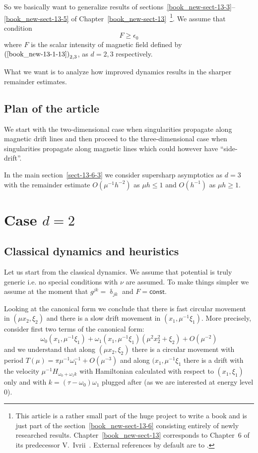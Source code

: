 \documentclass[12pt,oneside,openany,article]{memoir}
\numberwithin{equation}{chapter}
\theoremstyle{plain}
\theoremstyle{definition}
\theoremstyle{remark}
\numberwithin{equation}{chapter}
\newcounter{note}
\begin{document}
So we basically want  to generalize results of sections~\ref{book_new-sect-13-3}--\ref{book_new-sect-13-5} of
Chapter~\ref{book_new-sect-13}~\cite{futurebook}\footnote{\label{foot-13-0} This article is a rather small part of the huge project to write a book and is just part of the section~\ref{book_new-sect-13-6} consisting entirely of newly researched results. Chapter~\ref{book_new-sect-13} corresponds to Chapter~6 of its predecessor V.~Ivrii~\cite{Ivr1}. External references by default are to  \cite{futurebook}.}. We assume that condition \begin{equation}
F\ge \epsilon _0
\label{13-2-1}
\end{equation}
where $F$ is the scalar intensity of magnetic field defined by $\textup{(\ref{book_new-13-1-13})}_{2,3}$,  as $d=2,3$ respectively.

What we want is to analyze how improved dynamics results in the sharper remainder estimates.

\section*{Plan of the article}

We start with the two-dimensional case when singularities propagate along magnetic drift lines and then proceed to the three-dimensional case when singularities propagate along magnetic lines which could however have ``side-drift''.

In the main section~\ref{sect-13-6-3} we consider supersharp asymptotics as $d=3$ with the remainder estimate $O(\mu^{-1}h^{-2})$ as $\mu h\le 1$ and $O(h^{-1})$ as $\mu h\ge 1$.

\chapter{Case $d=2$}
\label{sect-13-6-1}

\section{Classical dynamics and heuristics}
\label{sect-13-6-1-1}

Let us start from the classical dynamics. We assume that potential is truly generic i.e. no special conditions with $\nu$ are assumed. To make things simpler we assume at the moment that $g^{jk}=\updelta_{jk}$ and $F={{\mathsf{const}}}$.

Looking at the canonical form we conclude that there is fast circular movement in $(\mu x_2,\xi_2)$ and there is a slow drift movement in $(x_1,\mu^{-1}\xi_1)$. More precisely, consider first two terms of the canonical form:
\begin{equation}
\omega_0 (x_1,\mu^{-1}\xi_1)+ \omega_1(x_1,\mu^{-1}\xi_1) (\mu^2 x_2^2+\xi_2) + O(\mu^{-2})
\label{13-6-1}
\end{equation}
and we understand that along $(\mu x_2,\xi_2)$ there is a circular movement with period $T(\mu)=\pi \mu^{-1}\omega_1^{-1}+O(\mu^{-3})$ and along $(x_1,\mu^{-1}\xi_1$ there is a drift with the velocity
$\mu^{-1}H_{\omega_0 + \omega_1 k}$ with Hamiltonian calculated with respect to $(x_1,\xi_1)$ only and with $k=(\tau-\omega_0) \omega_1$ plugged after (as we are interested at energy level $0$).
\end{document}
